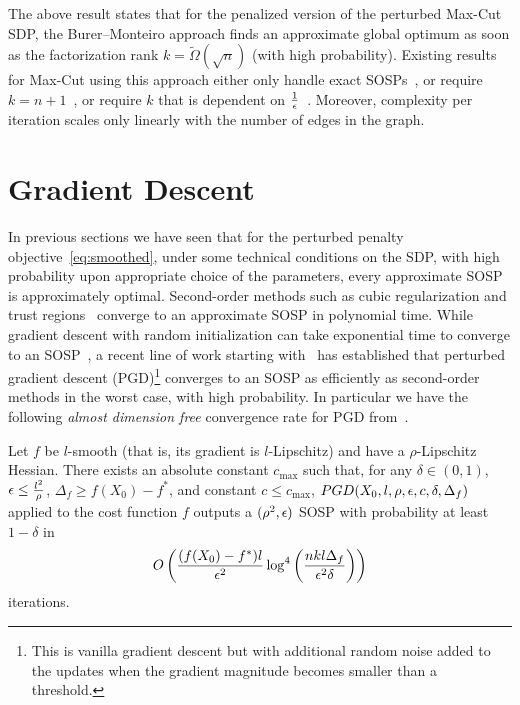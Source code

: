 The above result states that for the penalized version of the perturbed Max-Cut SDP, the Burer--Monteiro approach finds an approximate global optimum as soon as the factorization rank $k = \tilde{\Omega}(\sqrt{n})$ (with high probability). Existing results for Max-Cut using this approach either only handle exact SOSPs~\citep{boumal2016non}, or require $k=n+1$~\citep{boumal2016globalrates}, or require $k$ that is dependent on $\frac{1}{\epsilon}$~\citep{pmlr-v65-mei17a}. Moreover, complexity per iteration scales only linearly with the number of edges in the graph. %


\section{Gradient Descent}\label{sec:gd}
In previous sections we have seen that for the perturbed penalty objective~\eqref{eq:smoothed}, under some technical conditions on the SDP, with high probability upon appropriate choice of the parameters, every approximate SOSP is approximately optimal. Second-order methods such as cubic regularization and trust regions~\citep{nesterov2006cubic,cartis2012complexity} converge to an approximate SOSP in polynomial time.
While gradient descent with random initialization can take exponential time to converge to an SOSP~\citep{du2017gradient}, a recent line of work starting with~\citet{ge2015escaping} has established that perturbed gradient descent (PGD)\footnote{This is vanilla gradient descent but with additional random noise added to the updates when the gradient magnitude becomes smaller than a threshold.} converges to an SOSP as efficiently as second-order methods in the worst case, with high probability. In particular we have the following \emph{almost dimension free} convergence rate for PGD from~\citep{jin2017escape}.

\begin{theorem}
Let $f$ be $l$-smooth (that is, its gradient is $l$-Lipschitz) and have a $\rho$-Lipschitz Hessian. There exists an absolute constant $c_{\max}$ such that, for any $\delta \in (0, 1)$, $\epsilon \leq \frac{l^2}{\rho}$, $\Delta_f \geq f(X_0) -f^*$, and constant $c \leq c_{\max}$, $PGD(X_0,l,\rho,\epsilon,c,\delta,\Delta_f)$ applied to the cost function $f$ outputs a $(\rho^2,\epsilon)$ SOSP with probability at least $1-\delta$ in
$$O \left( \frac{(f(X_0)-f^*)l}{\epsilon^2} \log^4 \left( \frac{nkl \Delta_f}{\epsilon^2 \delta} \right) \right)$$
iterations.
\end{theorem}

